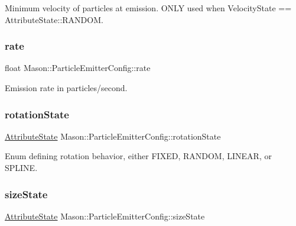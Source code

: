 Minimum velocity of particles at emission. O\+N\+LY used when Velocity\+State == Attribute\+State\+::\+R\+A\+N\+D\+OM. 

\hypertarget{struct_mason_1_1_particle_emitter_config_abc0c7231f9134e3b0456d22ee8d5c8a2}{}\label{struct_mason_1_1_particle_emitter_config_abc0c7231f9134e3b0456d22ee8d5c8a2} 
\subsubsection{\texorpdfstring{rate}{rate}}
{\footnotesize\ttfamily float Mason\+::\+Particle\+Emitter\+Config\+::rate}



Emission rate in particles/second. 

\hypertarget{struct_mason_1_1_particle_emitter_config_a35b60fea30c8a07adcfc77a3c30e1546}{}\label{struct_mason_1_1_particle_emitter_config_a35b60fea30c8a07adcfc77a3c30e1546} 
\subsubsection{\texorpdfstring{rotation\+State}{rotationState}}
{\footnotesize\ttfamily \hyperlink{namespace_mason_aefc2ce7d9295b57af46ab6c8ebfc32f7}{Attribute\+State} Mason\+::\+Particle\+Emitter\+Config\+::rotation\+State}



Enum defining rotation behavior, either F\+I\+X\+ED, R\+A\+N\+D\+OM, L\+I\+N\+E\+AR, or S\+P\+L\+I\+NE. 

\hypertarget{struct_mason_1_1_particle_emitter_config_a3f6f8e64ff56799d85b8512aa97801eb}{}\label{struct_mason_1_1_particle_emitter_config_a3f6f8e64ff56799d85b8512aa97801eb} 
\subsubsection{\texorpdfstring{size\+State}{sizeState}}
{\footnotesize\ttfamily \hyperlink{namespace_mason_aefc2ce7d9295b57af46ab6c8ebfc32f7}{Attribute\+State} Mason\+::\+Particle\+Emitter\+Config\+::size\+State}



